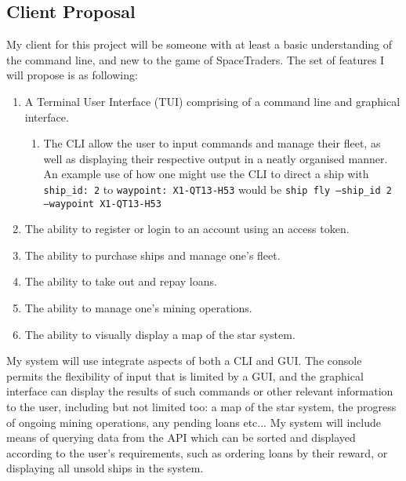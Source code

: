 \subsection{Client Proposal}
My client for this project will be someone with at least a basic understanding of the command line, and new to the game of SpaceTraders. The set of features I will propose is as following:
\begin{enumerate}
    \item A Terminal User Interface (TUI) comprising of a command line and graphical interface.
        \begin{enumerate}
            \item The CLI allow the user to input commands and manage their fleet, as well as displaying their respective output in a neatly organised manner. An example use of how one might use the CLI to direct a ship with \texttt{ship\_id: 2} to \texttt{waypoint: X1-QT13-H53} would be \texttt{ship fly --ship\_id 2 --waypoint X1-QT13-H53}
        \end{enumerate}
    \item The ability to register or login to an account using an access token.
    \item The ability to purchase ships and manage one's fleet.
    \item The ability to take out and repay loans.
    \item The ability to manage one's mining operations.
    \item The ability to visually display a map of the star system.
\end{enumerate}

My system will use integrate aspects of both a CLI and GUI. The console permits the flexibility of input that is limited by a GUI, and the graphical interface can display the results of such commands or other relevant information to the user, including but not limited too: a map of the star system, the progress of ongoing mining operations, any pending loans etc... My system will include means of querying data from the API which can be sorted and displayed according to the user's requirements, such as ordering loans by their reward, or displaying all unsold ships in the system. 

